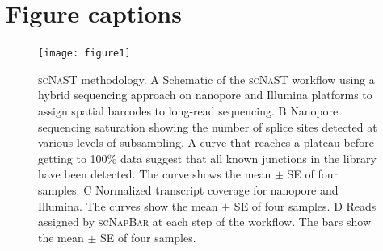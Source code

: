 \documentclass[utf8]{FrontiersinHarvard} %
\newcommand{\scn}{\textsc{scNapBar}\xspace}
\newcommand{\scnast}{\textsc{scNaST}\xspace}
\begin{document}

\section*{Figure captions}


\begin{figure}[h!]
\begin{center}
\texttt{[image: figure1]}
\end{center}
\caption{\scnast methodology. A Schematic of the \scnast workflow using a hybrid sequencing approach on nanopore and Illumina platforms to assign spatial barcodes to long-read sequencing. B Nanopore sequencing saturation showing the number of splice sites detected at various levels of subsampling. A curve that reaches a plateau before getting to 100\% data suggest that all known junctions in the library have been detected. The curve shows the mean $\pm$ SE of four samples. C Normalized transcript coverage for nanopore and Illumina. The curves show the mean $\pm$ SE of four samples. D Reads assigned by \scn at each step of the workflow. The bars show the mean $\pm$ SE of four samples.}\label{fig:1}
\end{figure}
\end{document}
